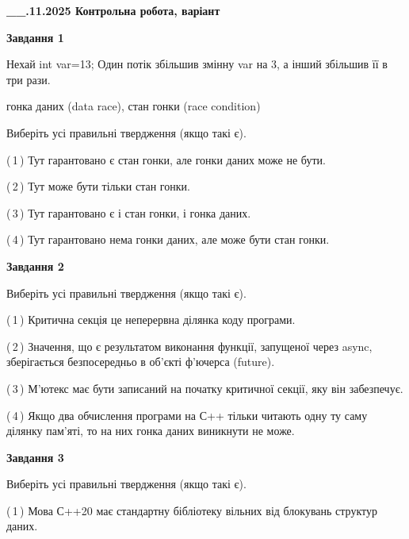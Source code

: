 \documentclass[12pt, ukrainian]{article}
\begin{document}
\begin {large}

\textbf{\_\_.11.2025 Контрольна робота, варіант  }\par


{

\begin{center}
\textbf{Завдання 1}
\end{center}
Нехай int var=13; Один потік збільшив змінну var на 3, а інший збільшив її в три рази.

гонка даних (data race), стан гонки (race condition)

Виберіть усі правильні твердження (якщо такі є).\par
\vspace{2mm}
(\,1\,) Тут гарантовано є стан гонки, але гонки даних може не бути.%

(\,2\,) Тут може бути тільки стан гонки.%

(\,3\,) Тут гарантовано є і стан гонки, і гонка даних.%

(\,4\,) Тут гарантовано нема гонки даних, але може бути стан гонки.%



\begin{center}
\textbf{Завдання 2}
\end{center}
Виберіть усі правильні твердження (якщо такі є).\par
\vspace{2mm}

(\,1\,) Критична секція це неперервна ділянка коду програми.%

(\,2\,) Значення, що є результатом виконання функції, запущеної через async, зберігається безпосередньо в об’єкті ф’ючерса (future).%

(\,3\,) М’ютекс має бути записаний на початку критичної секції, яку він забезпечує.%

(\,4\,) Якщо два обчислення програми на С++ тільки читають одну ту саму ділянку пам'яті, то на них гонка даних  виникнути не може.%



\begin{center}
\textbf{Завдання 3}
\end{center}
Виберіть усі правильні твердження (якщо такі є).\par
\vspace{2mm}

(\,1\,) Мова С++20 має стандартну бібліотеку вільних від блокувань структур даних.%

}
\end{large}
\end{document}

